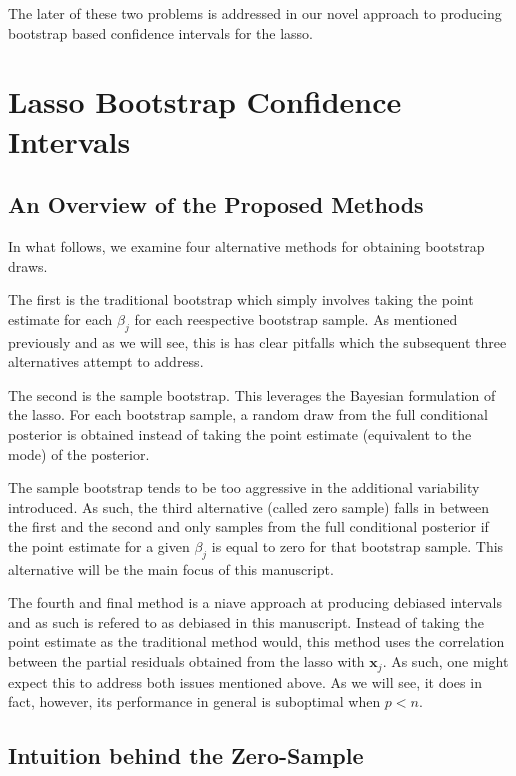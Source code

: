 The later of these two problems is addressed in our novel approach to producing bootstrap based confidence intervals for the lasso.

\section{Lasso Bootstrap Confidence Intervals}

\subsection{An Overview of the Proposed Methods}

In what follows, we examine four alternative methods for obtaining bootstrap draws.

The first is the traditional bootstrap which simply involves taking the point estimate for each $\beta_j$ for each reespective bootstrap sample. As mentioned previously and as we will see, this is has clear pitfalls which the subsequent three alternatives attempt to address.

The second is the sample bootstrap. This leverages the Bayesian formulation of the lasso. For each bootstrap sample, a random draw from the full conditional posterior is obtained instead of taking the point estimate (equivalent to the mode) of the posterior.

The sample bootstrap tends to be too aggressive in the additional variability introduced. As such, the third alternative (called zero sample) falls in between the first and the second and only samples from the full conditional posterior if the point estimate for a given $\beta_j$ is equal to zero for that bootstrap sample. This alternative will be the main focus of this manuscript.

The fourth and final method is a niave approach at producing debiased intervals and as such is refered to as debiased in this manuscript. Instead of taking the point estimate as the traditional method would, this method uses the correlation between the partial residuals obtained from the lasso with $\boldsymbol{x}_j$. As such, one might expect this to address both issues mentioned above. As we will see, it does in fact, however, its performance in general is suboptimal when $p < n$.


\subsection{Intuition behind the Zero-Sample}

